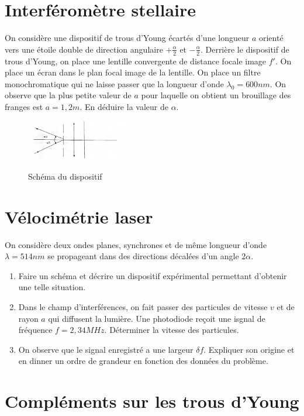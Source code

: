 \documentclass{article}
\begin{document}
\section{Interféromètre stellaire}
On considère une dispositif de trous d'Young écartés d'une longueur $a$ orienté vers une étoile double de direction angulaire $+ \frac{\alpha}{2}$ et $- \frac{ \alpha}{2}$. 
Derrière le dispositif de trous d'Young, on place une lentille convergente de distance focale image $f'$. 
On place un écran dans le plan focal image de la lentille. 
On place un filtre monochromatique qui ne laisse passer que la longueur d'onde $\lambda_0 = 600nm.$
On observe que la plus petite valeur de $a$ pour laquelle on obtient un brouillage des franges est $a=1,2m$. 
En déduire la valeur de $\alpha$. 



\begin{figure}[h!]
  \centering
  \includegraphics[width=0.4\textwidth]{interféromètre stellaire .jpg}
  \label{fig:maison}
    \caption{Schéma du dispositif}
\end{figure}

\section{Vélocimétrie laser}

On considère deux ondes planes, synchrones et de même longueur d'onde $\lambda = 514 nm$ se propageant dans des directions décalées d'un angle $2 \alpha$. 
\begin{enumerate}
  \item Faire un schéma et décrire un dispositif expérimental permettant d'obtenir une telle situation. 
  \item Dans le champ d'interférences, on fait passer des particules de vitesse $v$ et de rayon $a$ qui diffusent la lumière. Une photodiode reçoit une isgnal de fréquence $f=2,34MHz$. Déterminer la vitesse des particules. 
  \item On observe que le signal enregistré a une largeur $\delta f$. Expliquer son origine et en dinner un ordre de grandeur en fonction des données du problème. 
\end{enumerate} 

\section{Compléments sur les trous d'Young}
\end{document}
